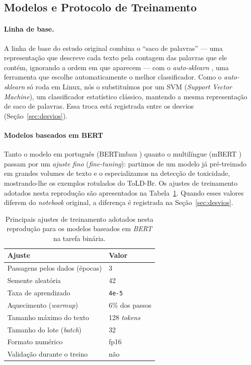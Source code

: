 \documentclass[sigconf, nonacm]{acmart}
\begin{document}
\subsection{Modelos e Protocolo de Treinamento}
\label{sec:protocolo}
 
\paragraph{Linha de base.} A linha de base do estudo original combina o
``saco de palavras'' --- uma representação que descreve cada texto pela
contagem das palavras que ele contém, ignorando a ordem em que aparecem ---
com o \emph{auto-sklearn} \cite{feurer2015efficient}, uma ferramenta que
escolhe automaticamente o melhor classificador. Como o \emph{auto-sklearn}
só roda em Linux, nós o substituímos por um SVM (\emph{Support Vector
Machine}), um classificador estatístico clássico, mantendo a mesma
representação de saco de palavras. Essa troca está registrada entre os
desvios (Seção~\ref{sec:desvios}).
 
\paragraph{Modelos baseados em BERT} Tanto o modelo em português
(BERTimbau \cite{souza2020bertimbau}) quanto o multilíngue (mBERT
\cite{devlin2019bert}) passam por um \emph{ajuste fino} (\emph{fine-tuning}):
partimos de um modelo já pré-treinado em grandes volumes de texto e o
especializamos na detecção de toxicidade, mostrando-lhe os exemplos
rotulados do ToLD-Br. Os ajustes de treinamento adotados nesta reprodução
são apresentados na Tabela~\ref{tab:hiperparametros}. Quando esses valores
diferem do \emph{notebook} original, a diferença é registrada na
Seção~\ref{sec:desvios}.
 
\begin{table}[t]
  \caption{Principais ajustes de treinamento adotados nesta reprodução para os modelos baseados em \emph{BERT} na tarefa binária.}
  \label{tab:hiperparametros}
  \small
  \begin{tabular}{@{}ll@{}}
    \toprule
    \textbf{Ajuste} & \textbf{Valor} \\
    \midrule
    Passagens pelos dados (épocas) & 3 \\
    Semente aleatória              & 42 \\
    Taxa de aprendizado            & \texttt{4e-5} \\
    Aquecimento (\emph{warmup})    & 6\% dos passos \\
    Tamanho máximo do texto        & 128 \emph{tokens} \\
    Tamanho do lote (\emph{batch}) & 32 \\
    Formato numérico               & fp16 \\
    Validação durante o treino     & não \\
    \bottomrule
  \end{tabular}
\end{table}
 
\end{document}
